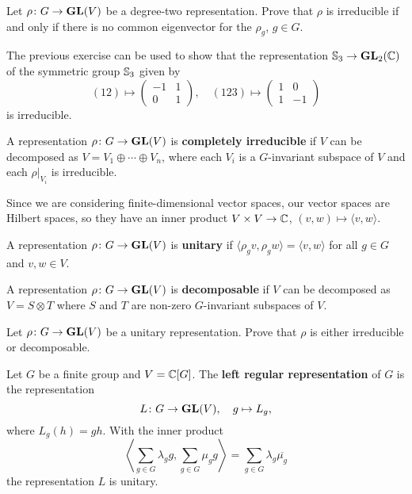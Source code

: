 \begin{exercise}
    Let $\rho\colon G\to\mathbf{GL}(V)$ be a degree-two representation. Prove that
    $\rho$ is irreducible if and only if there is no common eigenvector for the $\rho_g$, $g\in G$.
\end{exercise}

The previous exercise can be used to show that the representation
$\mathbb{S}_3\to\mathbf{GL}_2(\mathbb{C})$
of the symmetric group $\mathbb{S}_3$
given by
\[
(12)\mapsto\begin{pmatrix}
-1&1\\0&1
\end{pmatrix},
\quad
(123)\mapsto\begin{pmatrix}
1&0\\
1&-1
\end{pmatrix}
\]
is irreducible.

\begin{definition}
    A representation $\rho\colon G\to\mathbf{GL}(V)$ is \textbf{completely irreducible}
    if $V$ can be decomposed as
    $V=V_1\oplus\cdots\oplus V_n$, where each $V_i$ is a $G$-invariant subspace of $V$ and
    each $\rho|_{V_i}$ is irreducible.
\end{definition}

Since we are considering finite-dimensional vector spaces, our vector spaces are
Hilbert spaces, so they have
an inner product $V\times V\to\mathbb{C}$, $(v,w)\mapsto\langle v,w\rangle$.

\begin{definition}
    A representation $\rho\colon G\to\mathbf{GL}(V)$ is \textbf{unitary} if
    $\langle \rho_gv,\rho_gw\rangle=\langle v,w\rangle$ for all $g\in G$ and $v,w\in V$.
\end{definition}

\begin{definition}
A representation
$\rho\colon G\to\mathbf{GL}(V)$ is \textbf{decomposable} if $V$ can be decomposed as $V=S\otimes T$
where $S$ and $T$ are non-zero $G$-invariant subspaces of $V$.
\end{definition}

\begin{exercise}
Let $\rho\colon G\to\mathbf{GL}(V)$ be a unitary representation. Prove that $\rho$ is either
irreducible or decomposable.
\end{exercise}

\begin{example}
Let $G$ be a finite group and $V=\mathbb{C}[G]$. The \textbf{left regular representation}
of $G$ is the representation
\[
L\colon G\to\mathbf{GL}(V),
\quad
g\mapsto L_g,
\]
where $L_g(h)=gh$. With the inner product
\[
\left\langle\sum_{g\in G}\lambda_gg,\sum_{g\in G}\mu_gg\right\rangle=\sum_{g\in G}\lambda_g\overline{\mu_g}
\]
the representation $L$ is unitary.
\end{example}

